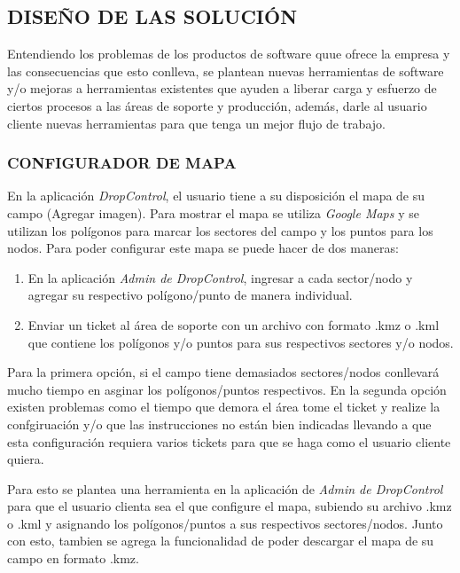 

\subsection{DISEÑO DE LAS SOLUCIÓN}

Entendiendo los problemas de los productos de software quue ofrece la empresa y las consecuencias que esto conlleva,
se plantean nuevas herramientas de software y/o mejoras a herramientas existentes que ayuden a liberar carga y esfuerzo
de ciertos procesos a las áreas de soporte y producción, además, darle al usuario cliente nuevas herramientas para que tenga un mejor flujo de trabajo.

\subsubsection{CONFIGURADOR DE MAPA}

En la aplicación \textit{DropControl}, el usuario tiene a su disposición el mapa de su campo (Agregar imagen). 
Para mostrar el mapa se utiliza \textit{Google Maps} y se utilizan los polígonos para marcar los sectores del campo y los puntos para los nodos.
Para poder configurar este mapa se puede hacer de dos maneras:
\begin{enumerate}
    \item En la aplicación \textit{Admin de DropControl}, ingresar a cada sector/nodo y agregar su respectivo polígono/punto de manera individual.
    \item Enviar un ticket al área de soporte con un archivo con formato .kmz o .kml que contiene los polígonos y/o puntos para sus respectivos sectores y/o nodos.
\end{enumerate}
Para la primera opción, si el campo tiene demasiados sectores/nodos conllevará mucho tiempo en asginar los polígonos/puntos respectivos.
En la segunda opción existen problemas como el tiempo que demora el área tome el ticket y realize la confgiruación y/o 
que las instrucciones no están bien indicadas llevando a que esta configuración requiera varios tickets para que se haga como el usuario cliente quiera.

Para esto se plantea una herramienta en la aplicación de \textit{Admin de DropControl} para que el usuario clienta sea el que
configure el mapa, subiendo su archivo .kmz o .kml y asignando los polígonos/puntos a sus respectivos sectores/nodos.
Junto con esto, tambien se agrega la funcionalidad de poder descargar el mapa de su campo en formato .kmz.

